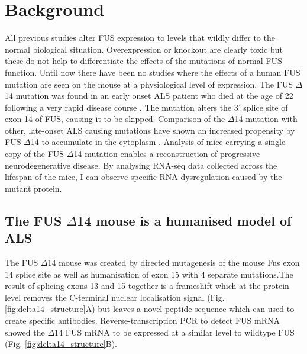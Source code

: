 \section{Background}
All previous studies alter FUS expression to levels that wildly differ to the normal biological situation. Overexpression or knockout are clearly toxic but these do not help to differentiate the effects of the mutations of normal FUS function. Until now there have been no studies where the effects of a human FUS mutation are seen on the mouse at a physiological level of expression. 
The FUS $\Delta$14 mutation was found in an early onset ALS patient who died at the age of 22 following a very rapid disease course \citep{DeJesus-Hernandez2010}. The mutation alters the 3' splice site of exon 14 of FUS, causing it to be skipped.  Comparison of the $\Delta$14 mutation with other, late-onset ALS causing mutations have shown an increased propensity by FUS $\Delta$14 to accumulate in the cytoplasm \citep{Verbeeck2012}. Analysis of mice carrying a single copy of the FUS $\Delta$14 mutation enables a reconstruction of progressive neurodegenerative disease. By analysing RNA-seq data collected across the lifespan of the mice, I can observe specific RNA dysregulation caused by the mutant protein.

\subsection{The FUS $\Delta$14 mouse is a humanised model of ALS}
The FUS $\Delta$14 mouse was created by directed mutagenesis of the mouse Fus exon 14 splice site as well as humanisation of exon 15 with 4 separate mutations.The result of splicing exons 13 and 15 together is a frameshift which at the protein level removes the C-terminal nuclear localisation signal (Fig. \ref{fig:delta14_structure}A) but leaves a novel peptide sequence which can used to create specific antibodies. Reverse-transcription PCR to detect FUS mRNA showed the $\Delta$14 FUS mRNA to be expressed at a similar level to wildtype FUS (Fig. \ref{fig:delta14_structure}B). 


